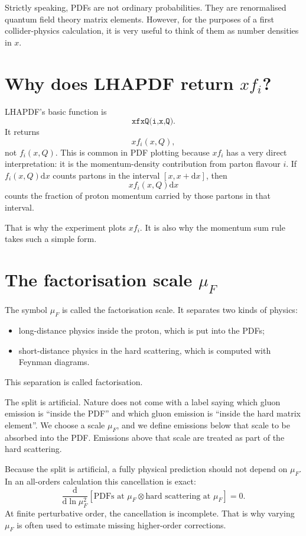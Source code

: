 \documentclass[11pt]{article}
\newcommand{\dd}{\mathrm{d}}
\newcommand{\muf}{\mu_F}
\begin{document}
Strictly speaking, PDFs are not ordinary probabilities.  They are
renormalised quantum field theory matrix elements.  However, for the purposes
of a first collider-physics calculation, it is very useful to think of them as
number densities in \(x\).

\section{Why does LHAPDF return \(x f_i\)?}

LHAPDF's basic function is
\[
  \texttt{xfxQ(i,x,Q)}.
\]
It returns
\[
  x f_i(x,Q),
\]
not \(f_i(x,Q)\).  This is common in PDF plotting because \(x f_i\) has a very
direct interpretation: it is the momentum-density contribution from parton
flavour \(i\).  If \(f_i(x,Q)\dd x\) counts partons in the interval
\([x,x+\dd x]\), then
\[
  x f_i(x,Q)\dd x
\]
counts the fraction of proton momentum carried by those partons in that
interval.

That is why the experiment plots \(x f_i\).  It is also why the momentum sum
rule takes such a simple form.

\section{The factorisation scale \(\muf\)}

The symbol \(\muf\) is called the factorisation scale.  It separates two kinds
of physics:
\begin{itemize}
  \item long-distance physics inside the proton, which is put into the PDFs;
  \item short-distance physics in the hard scattering, which is computed with
        Feynman diagrams.
\end{itemize}
This separation is called factorisation.

The split is artificial.  Nature does not come with a label saying which gluon
emission is ``inside the PDF'' and which gluon emission is ``inside the hard
matrix element''.  We choose a scale \(\muf\), and we define emissions below
that scale to be absorbed into the PDF.  Emissions above that scale are treated
as part of the hard scattering.

Because the split is artificial, a fully physical prediction should not depend
on \(\muf\).  In an all-orders calculation this cancellation is exact:
\[
  \frac{\dd}{\dd\ln\muf^2}
  \left[
    \text{PDFs at }\muf
    \otimes
    \text{hard scattering at }\muf
    \right]
  =0.
\]
At finite perturbative order, the cancellation is incomplete.  That is why
varying \(\muf\) is often used to estimate missing higher-order corrections.
\end{document}
